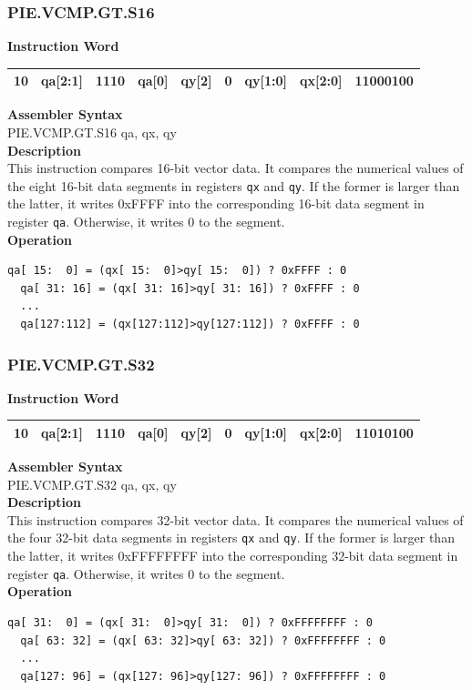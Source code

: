\newpage
\subsubsection{PIE.VCMP.GT.S16}\label{instruction:PIEVCMPGTS16}
\setlength\tabcolsep{6pt}
\textbf{Instruction Word} \\
\begin{tabular}{|c|c|c|c|c|c|c|c|c|}
	\hline
	10 & qa[2:1] & 1110 & qa[0] & qy[2] & 0 & qy[1:0] & qx[2:0] & 11000100 \\
	\hline
\end{tabular}

\textbf{Assembler Syntax} \\
PIE.VCMP.GT.S16 qa, qx, qy \\
\textbf{Description} \\
This instruction compares 16-bit vector data. It compares the numerical values of the eight 16-bit data segments in registers \lstinline{qx} and \lstinline{qy}. If the former is larger than the latter, it writes 0xFFFF into the corresponding 16-bit data segment in register \lstinline{qa}. Otherwise, it writes 0 to the segment.\\
\textbf{Operation}
\begin{lstlisting}[escapeinside=`?]
  qa[ 15:  0] = (qx[ 15:  0]>qy[ 15:  0]) ? 0xFFFF : 0
  qa[ 31: 16] = (qx[ 31: 16]>qy[ 31: 16]) ? 0xFFFF : 0
  ...
  qa[127:112] = (qx[127:112]>qy[127:112]) ? 0xFFFF : 0
\end{lstlisting}

\newpage
\subsubsection{PIE.VCMP.GT.S32}\label{instruction:PIEVCMPGTS32}
\setlength\tabcolsep{6pt}
\textbf{Instruction Word} \\
\begin{tabular}{|c|c|c|c|c|c|c|c|c|}
	\hline
	10 & qa[2:1] & 1110 & qa[0] & qy[2] & 0 & qy[1:0] & qx[2:0] & 11010100 \\
	\hline
\end{tabular}

\textbf{Assembler Syntax} \\
PIE.VCMP.GT.S32 qa, qx, qy \\
\textbf{Description} \\
This instruction compares 32-bit vector data. It compares the numerical values of the four 32-bit data segments in registers \lstinline{qx} and \lstinline{qy}. If the former is larger than the latter, it writes 0xFFFFFFFF into the corresponding 32-bit data segment in register \lstinline{qa}. Otherwise, it writes 0 to the segment.\\
\textbf{Operation}
\begin{lstlisting}[escapeinside=`?]
  qa[ 31:  0] = (qx[ 31:  0]>qy[ 31:  0]) ? 0xFFFFFFFF : 0
  qa[ 63: 32] = (qx[ 63: 32]>qy[ 63: 32]) ? 0xFFFFFFFF : 0
  ...
  qa[127: 96] = (qx[127: 96]>qy[127: 96]) ? 0xFFFFFFFF : 0
\end{lstlisting}

